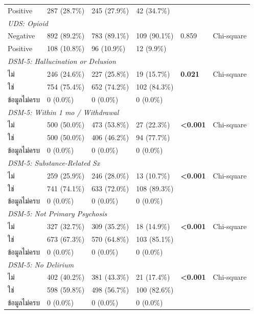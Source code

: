 \begin{table}[htbp]
\begin{tabular}{llllll}
\quad Positive & 287 (28.7\%) & 245 (27.9\%) & 42 (34.7\%) &  &  \\
\multicolumn{6}{l}{\textit{UDS: Opioid}} \\
\quad Negative & 892 (89.2\%) & 783 (89.1\%) & 109 (90.1\%) & 0.859 & Chi-square \\
\quad Positive & 108 (10.8\%) & 96 (10.9\%) & 12 (9.9\%) &  &  \\
\multicolumn{6}{l}{\textit{DSM-5: Hallucination or Delusion}} \\
\quad ไม่ & 246 (24.6\%) & 227 (25.8\%) & 19 (15.7\%) & \textbf{0.021} & Chi-square \\
\quad ใช่ & 754 (75.4\%) & 652 (74.2\%) & 102 (84.3\%) &  &  \\
\quad ข้อมูลไม่ครบ & 0 (0.0\%) & 0 (0.0\%) & 0 (0.0\%) &  &  \\
\multicolumn{6}{l}{\textit{DSM-5: Within 1 mo / Withdrawal}} \\
\quad ไม่ & 500 (50.0\%) & 473 (53.8\%) & 27 (22.3\%) & \textbf{<0.001} & Chi-square \\
\quad ใช่ & 500 (50.0\%) & 406 (46.2\%) & 94 (77.7\%) &  &  \\
\quad ข้อมูลไม่ครบ & 0 (0.0\%) & 0 (0.0\%) & 0 (0.0\%) &  &  \\
\multicolumn{6}{l}{\textit{DSM-5: Substance-Related Sx}} \\
\quad ไม่ & 259 (25.9\%) & 246 (28.0\%) & 13 (10.7\%) & \textbf{<0.001} & Chi-square \\
\quad ใช่ & 741 (74.1\%) & 633 (72.0\%) & 108 (89.3\%) &  &  \\
\quad ข้อมูลไม่ครบ & 0 (0.0\%) & 0 (0.0\%) & 0 (0.0\%) &  &  \\
\multicolumn{6}{l}{\textit{DSM-5: Not Primary Psychosis}} \\
\quad ไม่ & 327 (32.7\%) & 309 (35.2\%) & 18 (14.9\%) & \textbf{<0.001} & Chi-square \\
\quad ใช่ & 673 (67.3\%) & 570 (64.8\%) & 103 (85.1\%) &  &  \\
\quad ข้อมูลไม่ครบ & 0 (0.0\%) & 0 (0.0\%) & 0 (0.0\%) &  &  \\
\multicolumn{6}{l}{\textit{DSM-5: No Delirium}} \\
\quad ไม่ & 402 (40.2\%) & 381 (43.3\%) & 21 (17.4\%) & \textbf{<0.001} & Chi-square \\
\quad ใช่ & 598 (59.8\%) & 498 (56.7\%) & 100 (82.6\%) &  &  \\
\quad ข้อมูลไม่ครบ & 0 (0.0\%) & 0 (0.0\%) & 0 (0.0\%) &  &  \\

\end{tabular}
\end{table}

